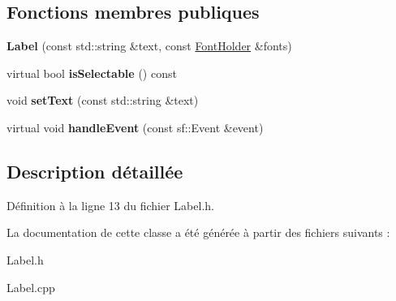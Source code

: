 \subsection*{Fonctions membres publiques}
\begin{DoxyCompactItemize}
\item 
\hypertarget{class_g_u_i_1_1_label_af7776f7b27736bf53a41b8aec79a60c5}{}\label{class_g_u_i_1_1_label_af7776f7b27736bf53a41b8aec79a60c5} 
{\bfseries Label} (const std\+::string \&text, const \hyperlink{class_resource_holder}{Font\+Holder} \&fonts)
\item 
\hypertarget{class_g_u_i_1_1_label_a93581f2d9ba05972df01788f8c9ad4ac}{}\label{class_g_u_i_1_1_label_a93581f2d9ba05972df01788f8c9ad4ac} 
virtual bool {\bfseries is\+Selectable} () const
\item 
\hypertarget{class_g_u_i_1_1_label_ab86467acdbe18a9fda4712a177e16dae}{}\label{class_g_u_i_1_1_label_ab86467acdbe18a9fda4712a177e16dae} 
void {\bfseries set\+Text} (const std\+::string \&text)
\item 
\hypertarget{class_g_u_i_1_1_label_ade8d6fc5a2f56198764ee0ee0f216068}{}\label{class_g_u_i_1_1_label_ade8d6fc5a2f56198764ee0ee0f216068} 
virtual void {\bfseries handle\+Event} (const sf\+::\+Event \&event)
\end{DoxyCompactItemize}


\subsection{Description détaillée}


Définition à la ligne 13 du fichier Label.\+h.



La documentation de cette classe a été générée à partir des fichiers suivants \+:\begin{DoxyCompactItemize}
\item 
Label.\+h\item 
Label.\+cpp\end{DoxyCompactItemize}
